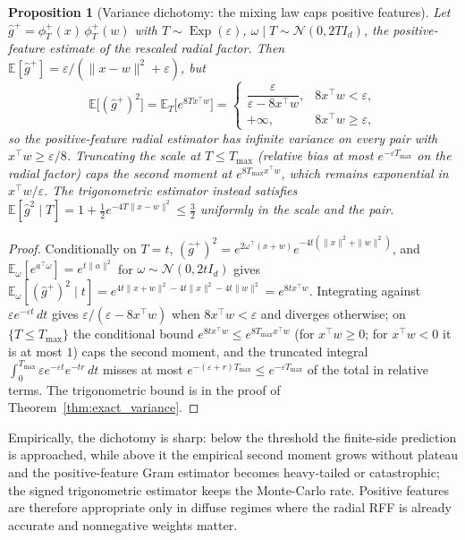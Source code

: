 \documentclass{article}
\newtheorem{proposition}[theorem]{Proposition}
\DeclareMathOperator{\Exp}{Exp}
\begin{document}
\begin{proposition}[Variance dichotomy: the mixing law caps positive features]\label{prop:pos_dichotomy}
Let $\widehat g^+=\phi^+_T(x)\,\phi^+_T(w)$ with $T\sim\Exp(\varepsilon)$, $\omega\mid T\sim\mathcal N(0,2TI_d)$, the positive-feature estimate of the rescaled radial factor. Then $\mathbb{E}[\widehat g^+]=\varepsilon/(\|x-w\|^2+\varepsilon)$, but
\[
\mathbb{E}\bigl[(\widehat g^+)^2\bigr]=\mathbb{E}_T\bigl[e^{8Tx^\top w}\bigr]=
\begin{cases}
\dfrac{\varepsilon}{\varepsilon-8x^\top w}, & 8x^\top w<\varepsilon,\\[4pt]
+\infty, & 8x^\top w\ge\varepsilon,
\end{cases}
\]
so the positive-feature radial estimator has \emph{infinite variance} on every pair with $x^\top w\ge\varepsilon/8$. Truncating the scale at $T\le T_{\max}$ (relative bias at most $e^{-\varepsilon T_{\max}}$ on the radial factor) caps the second moment at $e^{8T_{\max}x^\top w}$, which remains exponential in $x^\top w/\varepsilon$. The trigonometric estimator instead satisfies $\mathbb{E}[\widehat g^2\mid T]=1+\tfrac12e^{-4T\|x-w\|^2}\le\tfrac32$ uniformly in the scale and the pair.
\end{proposition}
\begin{proof}
Conditionally on $T=t$, $(\widehat g^+)^2=e^{2\omega^\top(x+w)}e^{-4t(\|x\|^2+\|w\|^2)}$, and $\mathbb{E}_\omega[e^{a^\top\omega}]=e^{t\|a\|^2}$ for $\omega\sim\mathcal N(0,2tI_d)$ gives $\mathbb{E}_\omega[(\widehat g^+)^2\mid t]=e^{4t\|x+w\|^2-4t\|x\|^2-4t\|w\|^2}=e^{8tx^\top w}$. Integrating against $\varepsilon e^{-\varepsilon t}\,dt$ gives $\varepsilon/(\varepsilon-8x^\top w)$ when $8x^\top w<\varepsilon$ and diverges otherwise; on $\{T\le T_{\max}\}$ the conditional bound $e^{8tx^\top w}\le e^{8T_{\max}x^\top w}$ (for $x^\top w\ge0$; for $x^\top w<0$ it is at most $1$) caps the second moment, and the truncated integral $\int_0^{T_{\max}}\varepsilon e^{-\varepsilon t}e^{-tr}\,dt$ misses at most $e^{-(\varepsilon+r)T_{\max}}\le e^{-\varepsilon T_{\max}}$ of the total in relative terms. The trigonometric bound is in the proof of Theorem~\ref{thm:exact_variance}.
\end{proof}
\noindent Empirically, the dichotomy is sharp: below the threshold the finite-side prediction is approached, while above it the empirical second moment grows without plateau and the positive-feature Gram estimator becomes heavy-tailed or catastrophic; the signed trigonometric estimator keeps the Monte-Carlo rate. Positive features are therefore appropriate only in diffuse regimes where the radial RFF is already accurate and nonnegative weights matter.
\end{document}
